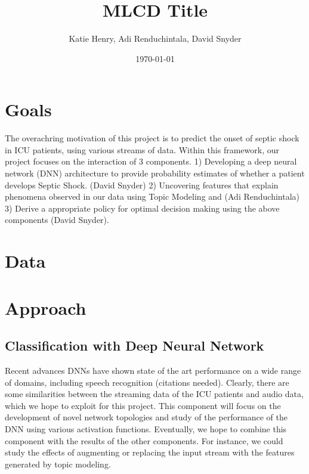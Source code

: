 \documentclass[dvips,12pt]{article}
\begin{document}

\title{MLCD Title}
\author{Katie Henry, Adi Renduchintala, David Snyder}
\date{\today}



\maketitle


\section{Goals}
The overachring  motivation of this project is to predict the onset of septic shock in ICU patients, using various streams of data. 
Within this framework, our project focuses on the interaction of 3 components.
1) Developing a deep neural network (DNN) architecture to provide probability estimates of whether a patient develops Septic Shock. (David Snyder)
2) Uncovering features that explain phenomena observed in our data  using Topic Modeling and  (Adi Renduchintala)
3) Derive a appropriate policy for optimal decision making using the above  components (David Snyder).


\section{Data}

\section{Approach}

\subsection{Classification with Deep Neural Network}

Recent advances DNNs have shown state of the art performance on a wide range of domains, including speech recognition (citations needed). Clearly, there are some similarities between
the streaming data of the ICU patients and audio data, which we hope to exploit for this project. This component will focus on the development of
novel network topologies and study of the performance of the DNN using various activation functions. Eventually, we hope to combine this component with the results of the other components. 
For instance, we could study the effects of augmenting or replacing the input stream with the features generated by topic modeling.
\end{document}
